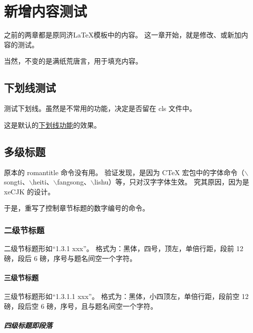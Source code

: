 \documentclass[../Main/thesis]{subfiles}
\begin{document}
\chapter{新增内容测试}
\label{cha:new}

之前的两章都是原同济LaTeX模板中的内容。
这一章开始，就是修改、或新加内容的测试。
\cite{RN2018}

当然，不变的是满纸荒唐言，用于填充内容。
\cite{RN2361}

\section{下划线测试}
\label{sec:underline}

测试下划线。虽然是不常用的功能，决定是否留在 cls 文件中。

这是默认的\underline{下划线功能}的效果。


\section{多级标题} \label{sec:seclv}

原本的 \textsf{romantitle} 命令没有用。
验证发现，是因为 \textsf{CTeX} 宏包中的字体命令（\textsf{$\backslash$songti}、\textsf{$\backslash$heiti}、\textsf{$\backslash$fangsong}、\textsf{$\backslash$lishu}）等，只对汉字字体生效。
究其原因，因为是 \textsf{xeCJK} 的设计。

于是，重写了控制章节标题的数字编号的命令。

\subsection{二级节标题} \label{ssc:subsec2}

二级节标题形如“1.3.1 xxx”。
格式为：黑体，四号，顶左，单倍行距，段前 12 磅，段后 6 磅，序号与题名间空一个字符。

\subsubsection{三级节标题} \label{sss:subsub3}

三级节标题形如“1.3.1.1 xxx”。
格式为：黑体，小四顶左，单倍行距，段前空 12 磅，段后空 6 磅，序号，且与题名间空一个字符。

\paragraph{四级标题即段落} \label{par:par4}
\end{document}
